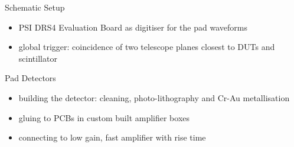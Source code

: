 \begin{frame}{Schematic Setup}
 
	\vspace*{-10pt}
 
	\begin{itemize}\itemfill
		\item PSI DRS4 Evaluation Board as digitiser for the pad waveforms
		\item global trigger: coincidence of two telescope planes closest to DUTs and scintillator
	\end{itemize}

\end{frame}
\begin{frame}{Pad Detectors}

	\begin{figure} 
		\centering
	\end{figure}\vspace*{5pt}
	
	\begin{itemize} \itemfill
		\item building the detector: cleaning, photo-lithography and Cr-Au metallisation
		\item gluing to PCBs in custom built amplifier boxes
		\item connecting to low gain, fast amplifier with  rise time
	\end{itemize}
	
\end{frame}